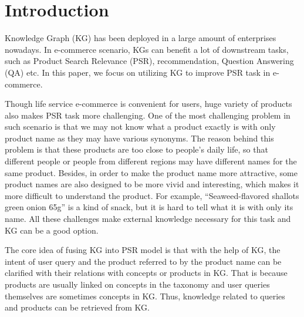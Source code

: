 \section{Introduction}

Knowledge Graph (KG) has been deployed in a large amount of enterprises nowadays. In e-commerce scenario, KGs can benefit a lot of downstream tasks, such as Product Search Relevance (PSR), recommendation, Question Answering (QA) etc. In this paper, we focus on utilizing KG to improve PSR task in e-commerce. 

 Though life service e-commerce is convenient for users, huge variety of products also makes PSR task more challenging. 
One of the most challenging problem in such scenario is that we may not know what a product exactly is with only product name as they may have various synonyms. The reason behind this problem is that these products are too close to people's daily life, so that different people or people from different regions may have different names for the same product. 
Besides, in order to make the product name more attractive, some product names are also designed to be more vivid and interesting, which makes it more difficult to understand the product. For example, ``Seaweed-flavored shallots green onion 65g'' is a kind of snack, but it is hard to tell what it is with only its name. 
All these challenges make external knowledge necessary for this task and KG can be a good option. 


The core idea of fusing KG into PSR model is that with the help of KG, the intent of user query and the product referred to by the product name can be clarified with their relations with concepts or products in KG. 
That is because products are usually linked on concepts in the taxonomy and user queries themselves are sometimes concepts in KG. 
Thus, knowledge related to queries and products can be retrieved from KG.

